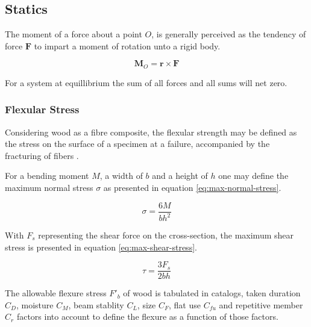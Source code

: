 \subsection{Statics}

The moment of a force about a point $O$, is generally perceived as the
tendency of force $\mathbf F$ to impart a moment of rotation unto a rigid
body.

\begin{equation}
  \mathbf M_O = \mathbf r \times \mathbf F
\end{equation}

For a system at equillibrium the sum of all forces and all sums will net zero.

\begin{tikzpicture}

\end{tikzpicture}

\cite{statics-and-mechs-of-materials}

\subsubsection{Flexular Stress}

Considering wood as a fibre composite, the flexular strength may be defined as
the stress on the surface of a specimen at a failure, accompanied by the
fracturing of fibers
\cite[chapter 7.2]{hodgikinson-mech-testing-fibre-composites}.

For a bending moment $M$, a width of $b$ and a height of $h$ one may define
the maximum normal stress $\sigma$ as presented in equation
\ref{eq:max-normal-stress}.

\begin{equation}\label{eq:max-normal-stress}
\sigma = \frac{6M}{bh^2}
\end{equation}

With $F_s$ representing the shear force on the cross-section, the maximum shear
stress is presented in equation \ref{eq:max-shear-stress}.

\begin{equation}\label{eq:max-shear-stress}
\tau = \frac{3F_s}{2bh}
\end{equation}

The allowable flexure stress $F'_b$ of wood is tabulated in catalogs, taken
duration $C_D$, moisture $C_M$, beam stablity $C_L$, size $C_F$,
flat use $C_{fu}$ and repetitive member $C_r$ factors into account to define
the flexure as a function of those factors.

